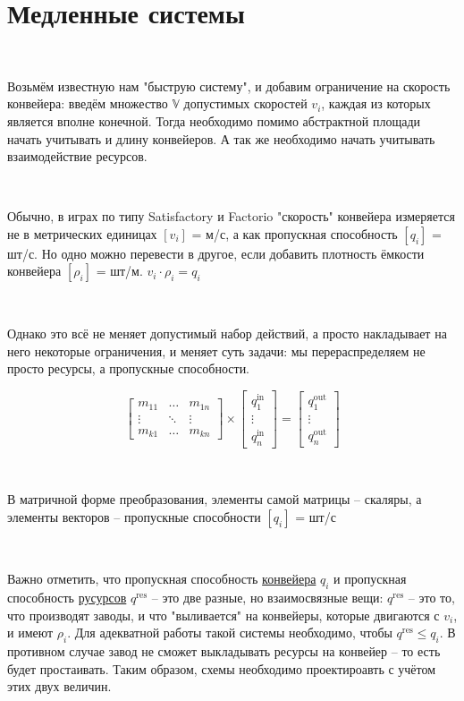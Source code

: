 \chapter{Медленные системы}

\

Возьмём известную нам "быструю систему", и добавим ограничение на скорость конвейера: введём множество $\mathbb{V}$  допустимых скоростей $v_i$, каждая из которых является вполне конечной. Тогда необходимо помимо абстрактной площади начать учитывать и длину конвейеров. А так же необходимо начать учитывать взаимодействие ресурсов.

\

Обычно, в играх по типу Satisfactory и Factorio "скорость" конвейера измеряется не в метрических единицах $[v_i]$ = м/с, а как пропускная способность $[q_i]$ = шт/с. Но одно можно перевести в другое, если добавить плотность ёмкости конвейера $[\rho_i]$ = шт/м. $v_i \cdot \rho_i = q_i$

\

Однако это всё не меняет допустимый набор действий, а просто накладывает на него некоторые ограничения, и меняет суть задачи: мы перераспределяем не просто ресурсы, а пропускные способности.

$$
\left[
\begin{matrix}
	m_{11} & \ldots & m_{1n} \\
	\vdots & \ddots & \vdots \\
	m_{k1} & \ldots & m_{kn}
\end{matrix}
\right]
\times
\left[
\begin{matrix}
	q^{\text{in}}_1 \\
	\vdots \\
	q^{\text{in}}_n
\end{matrix}
\right]
=
\left[
\begin{matrix}
	q^{\text{out}}_1 \\
	\vdots \\
	q^{\text{out}}_n
\end{matrix}
\right]
$$

\

В матричной форме преобразования, элементы самой матрицы -- скаляры, а элементы векторов -- пропускные способности $[q_i]$ = шт/с

\

Важно отметить, что пропускная способность \underline{конвейера} $q_i$ и пропускная способность \underline{русурсов} $q^{\text{res}}$ -- это две разные, но взаимосвязные вещи: $q^{\text{res}}$ -- это то, что производят заводы, и что "выливается" на конвейеры, которые двигаются с $v_i$, и имеют $\rho_i$. Для адекватной работы такой системы необходимо, чтобы $q^{\text{res}} \le q_i$. В противном случае завод не сможет выкладывать ресурсы на конвейер -- то есть будет простаивать. Таким образом, схемы необходимо проектироавть с учётом этих двух величин.

